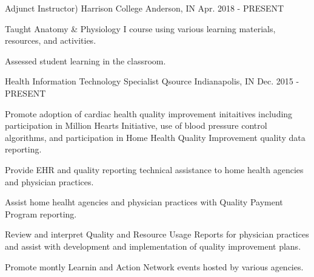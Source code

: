 

\begin{cventries}

  \cventry
    {Adjunct Instructor)}
    {Harrison College}
    {Anderson, IN}
    {Apr. 2018 - PRESENT}
    {
      \begin{cvitems}
        \item {Taught Anatomy \& Physiology I course using various learning materials, resources, and activities.}
        \item {Assessed student learning in the classroom.}
      \end{cvitems}
    }

  \cventry
    {Health Information Technology Specialist} %
    {Qsource} %
    {Indianapolis, IN} %
    {Dec. 2015 - PRESENT} %
    {
      \begin{cvitems} %
        \item {Promote adoption of cardiac health quality improvement initaitives including participation in Million Hearts Initiative, use of blood pressure control algorithms, and participation in Home Health Quality Improvement quality data reporting.}
        \item {Provide EHR and quality reporting technical assistance to home health agencies and physician practices.}
        \item {Assist home healht agencies and physician practices with Quality Payment Program reporting.}
        \item {Review and interpret Quality and Resource Usage Reports for physician practices and assist with development and implementation of quality improvement plans.}
        \item {Promote montly Learnin and Action Network events hosted by various agencies.}
      \end{cvitems}
    }


\end{cventries}
